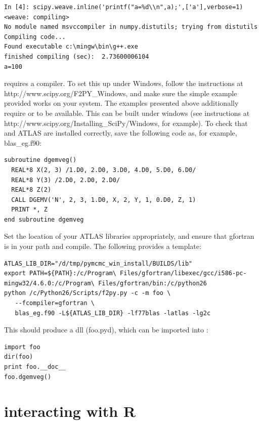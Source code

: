 \documentclass[article]{jss}
\begin{document}
\begin{lstlisting}[basicstyle={\scriptsize}]
In [4]: scipy.weave.inline('printf("a=%d\\n",a);',['a'],verbose=1)
<weave: compiling>
No module named msvccompiler in numpy.distutils; trying from distutils
Compiling code...
Found executable c:\mingw\bin\g++.exe
finished compiling (sec):  2.73600006104
a=100
\end{lstlisting}


 requires a  compiler. To set this up
under Windows, follow the instructions at
http://www.scipy.org/F2PY\_Windows, and make sure the simple example
provided works on your system. The examples presented above
additionally require  or  to be available. This
can be built under windows (see instructions at
http://www.scipy.org/Installing\_SciPy/Windows, for example). To check
that  and ATLAS are installed correctly, save the following
code as, for example, blas\_eg.f90:


\begin{lstlisting}[basicstyle={\scriptsize}]
subroutine dgemveg()
  REAL*8 X(2, 3) /1.D0, 2.D0, 3.D0, 4.D0, 5.D0, 6.D0/
  REAL*8 Y(3) /2.D0, 2.D0, 2.D0/
  REAL*8 Z(2)
  CALL DGEMV('N', 2, 3, 1.D0, X, 2, Y, 1, 0.D0, Z, 1)
  PRINT *, Z
end subroutine dgemveg
\end{lstlisting}


Set the location of your ATLAS libraries appropriately, and ensure
that gfortran is in your path and compile. The following provides a
template:


\begin{lstlisting}[basicstyle={\scriptsize}]
ATLAS_LIB_DIR="/d/tmp/pymcmc_win_install/BUILDS/lib"
export PATH=${PATH}:/c/Program\ Files/gfortran/libexec/gcc/i586-pc-mingw32/4.6.0:/c/Program\ Files/gfortran/bin:/c/python26 
python /c/Python26/Scripts/f2py.py -c -m foo \
   --fcompiler=gfortran \
   blas_eg.f90 -L${ATLAS_LIB_DIR} -lf77blas -latlas -lg2c 
\end{lstlisting}


This should produce a  dll (foo.pyd), which can be imported
into :


\begin{lstlisting}[basicstyle={\scriptsize}]
import foo
dir(foo) 
print foo.__doc__
foo.dgemveg() 
\end{lstlisting}

\section[PyMCMC interacting with R]{ interacting with R}
\label{sec:PyMCMC-interacting-with}
\end{document}
